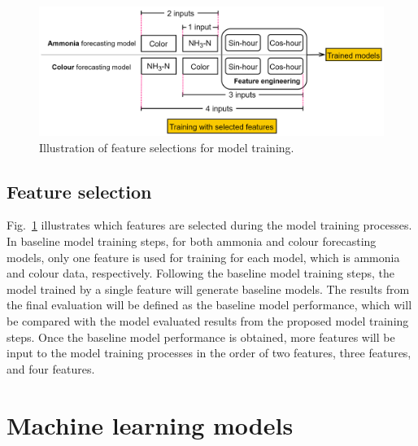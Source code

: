 \begin{figure}[!ht]
    \centering
    \includegraphics[width=1.0\columnwidth]{imgs/pre-processing/feature-selection.png}
    \caption{Illustration of feature selections for model training.}
    \label{fig:feature-selection}
 \end{figure}

\subsection{Feature selection}
Fig.~\ref{fig:feature-selection} illustrates which features are selected during the model training processes. In baseline model training steps, for both ammonia and colour forecasting models, only one feature is used for training for each model, which is ammonia and colour data, respectively. Following the baseline model training steps, the model trained by a single feature will generate baseline models. The results from the final evaluation will be defined as the baseline model performance, which will be compared with the model evaluated results from the proposed model training steps. Once the baseline model performance is obtained, more features will be input to the model training processes in the order of two features, three features, and four features.

\section{Machine learning models}
